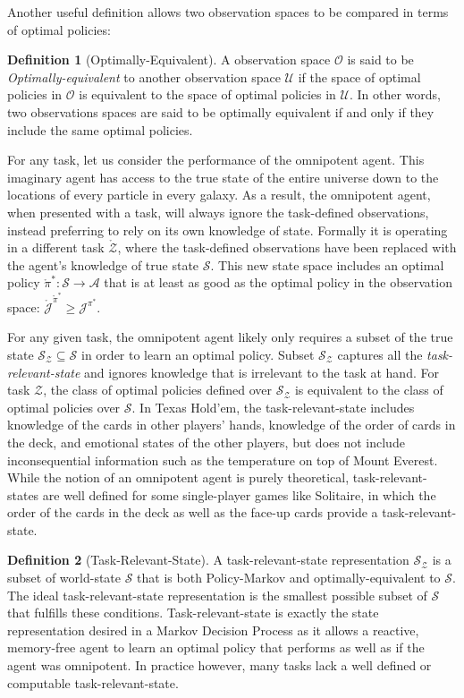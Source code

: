\documentclass{article} %
\theoremstyle{definition}
\newtheorem{definition}{Definition}[section]
\begin{document}
Another useful definition allows two observation spaces to be compared
in terms of optimal policies:

\begin{definition}[Optimally-Equivalent]
A observation space $\mathcal{O}$ is said to be
\textit{Optimally-equivalent} to another observation space
$\mathcal{U}$ if the space of optimal policies in $\mathcal{O}$ is
equivalent to the space of optimal policies in $\mathcal{U}$. In other
words, two observations spaces are said to be optimally equivalent if
and only if they include the same optimal policies.
\end{definition}

For any task, let us consider the performance of the omnipotent
agent. This imaginary agent has access to the true state of the entire
universe down to the locations of every particle in every galaxy. As a
result, the omnipotent agent, when presented with a task, will always
ignore the task-defined observations, instead preferring to rely on
its own knowledge of state. Formally it is operating in a different
task $\mathring{\mathcal{Z}}$, where the task-defined observations
have been replaced with the agent's knowledge of true state
$\mathcal{S}$. This new state space includes an optimal policy
$\mathring{\pi}^*: \mathcal{S} \rightarrow \mathcal{A}$ that is at
least as good as the optimal policy in the observation space:
$\mathring{\mathcal{J}}^{\mathring{\pi}^*} \ge \mathcal{J}^{\pi^*}$.

For any given task, the omnipotent agent likely only requires a subset
of the true state $\mathcal{S}_\mathcal{Z} \subseteq \mathcal{S}$ in
order to learn an optimal policy. Subset $\mathcal{S}_\mathcal{Z}$
captures all the \textit{task-relevant-state} and ignores knowledge
that is irrelevant to the task at hand. For task $\mathcal{Z}$, the
class of optimal policies defined over $\mathcal{S}_\mathcal{Z}$ is
equivalent to the class of optimal policies over $\mathcal{S}$. In
Texas Hold'em, the task-relevant-state includes knowledge of the cards
in other players' hands, knowledge of the order of cards in the deck,
and emotional states of the other players, but does not include
inconsequential information such as the temperature on top of Mount
Everest. While the notion of an omnipotent agent is purely
theoretical, task-relevant-states are well defined for some
single-player games like Solitaire, in which the order of the cards in
the deck as well as the face-up cards provide a task-relevant-state.

\begin{definition}[Task-Relevant-State]
\label{def:taskRelState}
A task-relevant-state representation $\mathcal{S}_\mathcal{Z}$ is a
subset of world-state $\mathcal{S}$ that is both Policy-Markov and
optimally-equivalent to $\mathcal{S}$. The ideal task-relevant-state
representation is the smallest possible subset of $\mathcal{S}$ that
fulfills these conditions. Task-relevant-state is exactly the state
representation desired in a Markov Decision Process as it allows a
reactive, memory-free agent to learn an optimal policy that performs
as well as if the agent was omnipotent. In practice however, many
tasks lack a well defined or computable task-relevant-state.
\end{definition}
\end{document}
